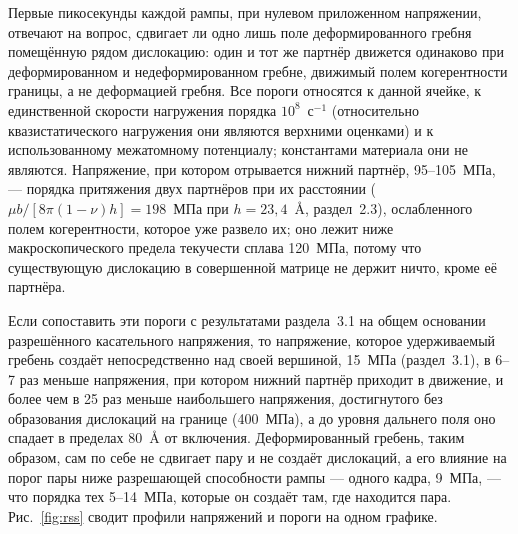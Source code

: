 Первые пикосекунды каждой рампы, при нулевом приложенном напряжении, отвечают на вопрос, сдвигает ли одно лишь поле деформированного гребня помещённую рядом дислокацию: один и тот же партнёр движется одинаково при деформированном и недеформированном гребне, движимый полем когерентности границы, а не деформацией гребня. Все пороги относятся к данной ячейке, к единственной скорости
нагружения порядка $10^{8}$~с$^{-1}$ (относительно квазистатического
нагружения они являются верхними оценками) и к использованному межатомному
потенциалу; константами материала они не являются. Напряжение, при котором
отрывается нижний партнёр, 95--105~МПа, --- порядка притяжения
двух партнёров при их расстоянии ($\mu b/[8\pi(1-\nu)h] = 198$~МПа при
$h = 23{,}4$~\AA{}, раздел~2.3), ослабленного полем когерентности, которое
уже развело их; оно лежит ниже макроскопического предела текучести сплава
120~МПа, потому что существующую дислокацию в совершенной матрице не держит
ничто, кроме её партнёра.

Если сопоставить эти пороги с результатами раздела~3.1 на общем основании
разрешённого касательного напряжения, то напряжение, которое удерживаемый
гребень создаёт непосредственно над своей вершиной, 15~МПа (раздел~3.1), в
6--7 раз меньше напряжения, при котором нижний партнёр приходит в
движение, и более чем в 25 раз меньше наибольшего напряжения, достигнутого без образования дислокаций на границе (400~МПа), а до уровня дальнего поля оно спадает в
пределах 80~\AA{} от включения. Деформированный гребень, таким образом, сам
по себе не сдвигает пару и не создаёт дислокаций, а его влияние на порог пары ниже разрешающей способности рампы --- одного
кадра, 9~МПа, --- что порядка тех 5--14~МПа, которые он создаёт там, где
находится пара. Рис.~\ref{fig:rss} сводит профили напряжений и пороги на одном
графике.

